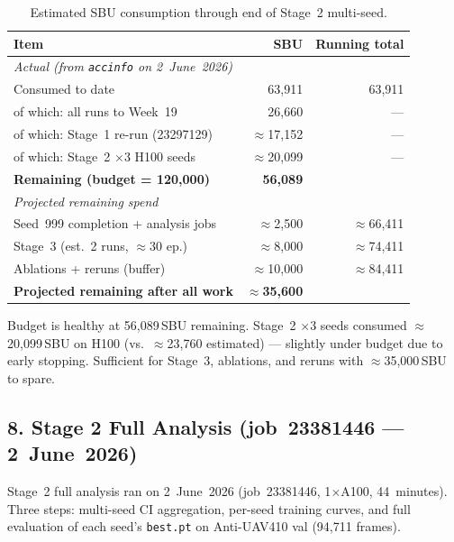 \begin{table}[h]
\centering
\caption{Estimated SBU consumption through end of Stage~2 multi-seed.}
\label{tab:budget_w2021}
\begin{tabular}{lrr}
\hline
\textbf{Item}                           & \textbf{SBU}        & \textbf{Running total} \\
\hline
\multicolumn{3}{l}{\textit{Actual (from \texttt{accinfo} on 2~June~2026)}} \\
\hline
Consumed to date                        & 63,911              & 63,911 \\
\quad of which: all runs to Week~19     & 26,660              & — \\
\quad of which: Stage~1 re-run (23297129) & $\approx$17,152   & — \\
\quad of which: Stage~2 $\times$3 H100 seeds & $\approx$20,099 & — \\
\hline
\textbf{Remaining (budget = 120,000)}   & \textbf{56,089}     & \\
\hline
\multicolumn{3}{l}{\textit{Projected remaining spend}} \\
\hline
Seed~999 completion + analysis jobs     & $\approx$2,500    & $\approx$66,411 \\
Stage~3 (est.\ 2 runs, $\approx$30 ep.) & $\approx$8,000   & $\approx$74,411 \\
Ablations + reruns (buffer)             & $\approx$10,000   & $\approx$84,411 \\
\hline
\textbf{Projected remaining after all work} & \textbf{$\approx$35,600} & \\
\hline
\end{tabular}
\end{table}

\noindent Budget is healthy at 56,089\,SBU remaining.
Stage~2 $\times$3 seeds consumed $\approx$20,099\,SBU on H100
(vs.\ $\approx$23,760 estimated) — slightly under budget due to
early stopping. Sufficient for Stage~3, ablations, and reruns
with $\approx$35,000\,SBU to spare.

\subsection*{8. Stage 2 Full Analysis (job~23381446 — 2~June~2026)}

Stage~2 full analysis ran on 2~June~2026 (job~23381446, 1$\times$A100,
44~minutes). Three steps: multi-seed CI aggregation, per-seed training
curves, and full evaluation of each seed's \texttt{best.pt} on
Anti-UAV410 val (94,711 frames).

